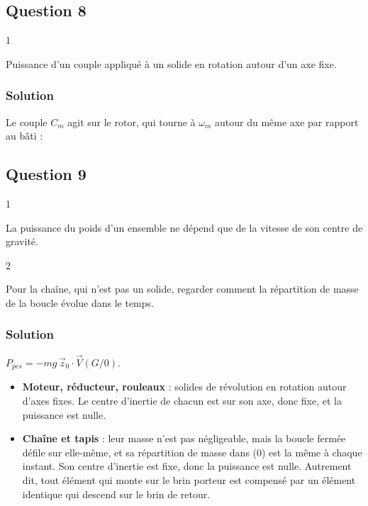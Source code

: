 \documentclass[11pt,a4paper]{article}
\providecommand{\tightlist}{\setlength{\itemsep}{0pt}\setlength{\parskip}{0pt}}
\newcommand{\equationajustee}[1]{%
  \sbox{\boiteequation}{$\displaystyle #1$}%
  \ifdim\wd\boiteequation>\linewidth
    \[\resizebox{\linewidth}{!}{\usebox{\boiteequation}}\]%
  \else
    \[#1\]%
  \fi}
\begin{document}
\hypertarget{question-8}{%
\subsection{Question 8}\label{question-8}}

\begin{indication}{1}

Puissance d'un couple appliqué à un solide en rotation autour d'un axe fixe.

\end{indication}

\hypertarget{solution-7}{%
\subsubsection{Solution}\label{solution-7}}

Le couple \(C_m\) agit sur le rotor, qui tourne à \(\omega_m\) autour du même axe par rapport au bâti :

\equationajustee{\boxed{P_{mot}=C_m(t)\,\omega_m(t)}}

\hypertarget{question-9}{%
\subsection{Question 9}\label{question-9}}

\begin{indication}{1}

La puissance du poids d'un ensemble ne dépend que de la vitesse de son centre de gravité.

\end{indication}

\begin{indication}{2}

Pour la chaîne, qui n'est pas un solide, regarder comment la répartition de masse de la boucle évolue dans le temps.

\end{indication}

\hypertarget{solution-8}{%
\subsubsection{Solution}\label{solution-8}}

\(P_{pes}=-mg\,\vec z_0\cdot\vec V(G/0)\).

\begin{itemize}
\tightlist
\item
  \textbf{Moteur, réducteur, rouleaux} : solides de révolution en rotation autour d'axes fixes. Le centre d'inertie de chacun est sur son axe, donc fixe, et la puissance est nulle.
\item
  \textbf{Chaîne et tapis} : leur masse n'est pas négligeable, mais la boucle fermée défile sur elle-même, et sa répartition de masse dans (0) est la même à chaque instant. Son centre d'inertie est fixe, donc la puissance est nulle. Autrement dit, tout élément qui monte sur le brin porteur est compensé par un élément identique qui descend sur le brin de retour.
\end{itemize}
\end{document}
